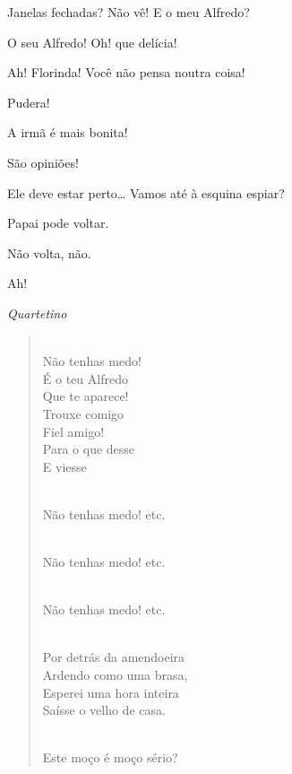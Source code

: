 \begin{linenumbers}




  Janelas fechadas?
Não vê! E o meu Alfredo?

  O seu Alfredo! Oh! que
delícia! 

 Ah! Florinda!
Você não pensa noutra coisa!

 Pudera!

 
A irmã é mais bonita!

 
São opiniões!

 Ele deve estar
perto\ldots{} Vamos até à esquina espiar?

 Papai pode voltar.

 Não volta, não.

  Ah!		\EP[]

{\smallskip\raggedleft\itshape Quartetino\par}
\begin{verse}

 \\
Não tenhas medo!\\
É o teu Alfredo\\
Que te aparece!\\
Trouxe comigo\\
Fiel amigo!\\
Para o que desse\\
E viesse


\\
Não tenhas medo! etc.


\\
Não tenhas medo! etc.


\\
Não tenhas medo! etc.


\\
Por detrás da amendoeira\\
Ardendo como uma brasa,\\
Esperei uma hora inteira\\
Saísse o velho de casa.

 \\
Este moço é moço sério?


\end{verse}
\end{linenumbers}
